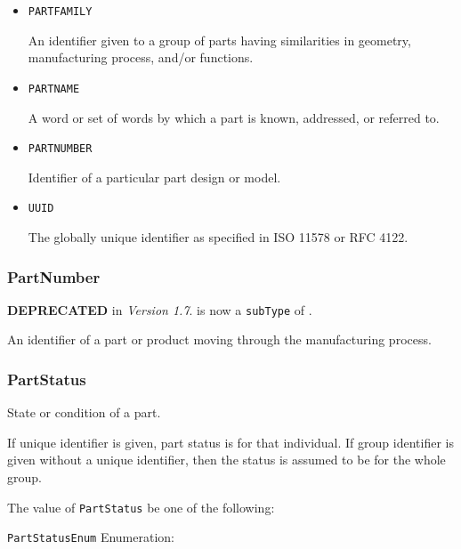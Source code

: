 \begin{itemize}

\item \texttt{PART\textunderscore FAMILY}


An identifier given to a group of parts having similarities in geometry, manufacturing process, and/or functions.

\item \texttt{PART\textunderscore NAME}


A word or set of words by which a part is known, addressed, or referred to.

\item \texttt{PART\textunderscore NUMBER}


Identifier of a particular part design or model.

\item \texttt{UUID}


The globally unique identifier as specified in ISO 11578 or RFC 4122.


\end{itemize}







\subsubsection{PartNumber}
\label{sec:PartNumber}



\textbf{DEPRECATED} in \textit{Version 1.7}.  is now a \texttt{subType} of
.

An identifier of a part or product moving through the manufacturing process.



\subsubsection{PartStatus}
\label{sec:PartStatus}



State or condition of a part.

If unique identifier is given, part status is for that individual. If group identifier is given without a unique identifier, then the status is assumed to be for the whole group.


The value of \texttt{PartStatus} \MUST be one of the following: 


\texttt{PartStatusEnum} Enumeration:

